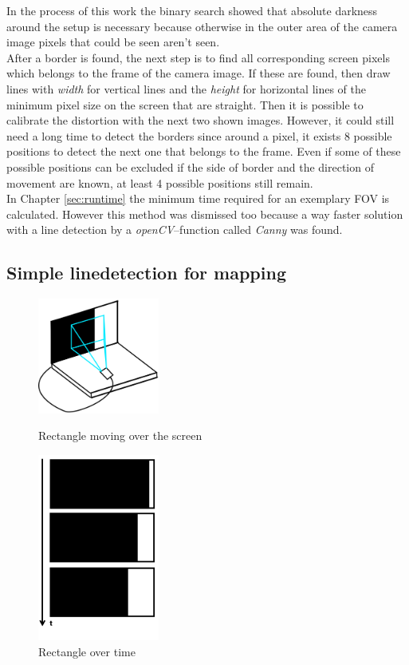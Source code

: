\documentclass[journal,final,a4paper,twoside]{PS}
\begin{document}
In the process of this work the binary search showed that absolute darkness around the setup is necessary because otherwise in the outer area of the camera image pixels that could be seen aren't seen. \\
After a border is found, the next step is to find all corresponding screen pixels which belongs to the frame of the camera image. If these are found, then draw lines with \emph{width} for vertical lines and the \emph{height} for horizontal lines of the minimum pixel size on the screen that are straight. Then it is possible  to calibrate the distortion with the next two shown images. However, it could still need a long time to detect the borders since around a pixel, it exists 8 possible positions to detect the next one that belongs to the frame. Even if some of these possible positions can be excluded if the side of border and the direction of movement are known, at least 4 possible positions still remain. \\%
In Chapter \ref{sec:runtime} the minimum time required for an exemplary FOV is calculated. However this method was dismissed too because a way faster solution with a line detection by a \emph{openCV}--function called \emph{Canny} was found. 

\subsection{Simple linedetection for mapping}
\label{sec:linedetect}
\begin{figure}[h]
\centering
\parbox{4cm}{
\includegraphics[width=4cm]{./pics/rect.png}
\caption{Rectangle moving over the screen}
\label{fig:setup}}
\qquad
\begin{minipage}{4cm}
\includegraphics[width=4cm]{./pics/pattern.png}
\caption{Rectangle over time}
\label{fig:blockOverTime}
\end{minipage}
\end{figure}
\end{document}
